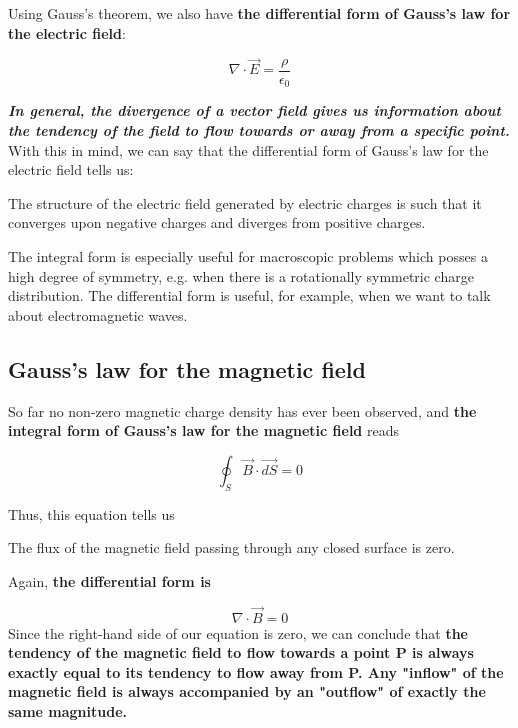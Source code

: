Using Gauss's theorem, we also have \textbf{the differential form of Gauss's law for the electric field}:
\begin{qt}
    \begin{equation}
\nabla \cdot \vec{E}=\frac{\rho}{\epsilon_{0}}
\end{equation}
\end{qt}
\textit{\textbf{In general, the divergence of a vector field gives us information about the tendency of the field to flow towards or away from a specific point.}} With this in mind, we can say that the differential form of Gauss’s law for the electric field tells us:
\begin{qt}
    The structure of the electric field generated by electric charges is such that it converges upon negative charges and diverges from positive charges.
\end{qt}
The integral form is especially useful for macroscopic problems
which posses a high degree of symmetry, e.g. when there is a rotationally symmetric charge distribution. The differential form is useful, for example, when we want to talk about electromagnetic waves.
\subsection{Gauss's law for the magnetic field}
So far no non-zero magnetic
charge density has ever been observed, and \textbf{the integral form of Gauss's law for the magnetic field} reads
\begin{qt}
    \begin{equation}
\oint_{S} \vec{B} \cdot \overrightarrow{d S}=0
\end{equation}
\end{qt}
Thus, this equation tells us
\begin{qt}
    The flux of the magnetic field passing through any closed surface is zero.
\end{qt}
Again, \textbf{the differential form is}
\begin{qt}
    \begin{equation}
\nabla \cdot \vec{B}=0
\end{equation}
Since the right-hand side of our equation is zero, we can conclude that\textbf{ the tendency of the magnetic field to flow towards a point P is always exactly equal to its tendency to flow away from P. Any "inflow" of the magnetic field is always accompanied by an "outflow" of exactly the same magnitude.}
\end{qt}

